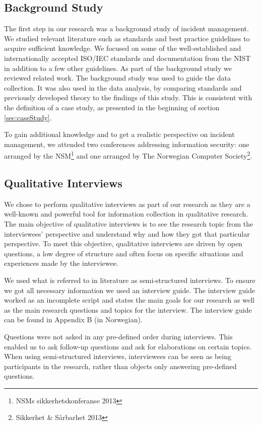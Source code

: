 \subsection{Background Study}
\label{sec:background}
The first step in our research was a background study of incident management. We studied relevant literature such as standards and best practice guidelines to acquire sufficient knowledge. We focused on some of the well-established and internationally accepted ISO/IEC standards and documentation from the \ac{NIST} in addition to a few other guidelines. As part of the background study we reviewed related work. The background study was used to guide the data collection. It was also used in the data analysis, by comparing standards and previously developed theory to the findings of this study. This is consistent with the definition of a case study, as presented in the beginning of section \ref{sec:caseStudy}.

To gain additional knowledge and to get a realistic perspective on incident management, we attended two conferences addressing information security: one arranged by the \ac{NSM}\footnote{NSMs sikkerhetskonferanse 2013} and one arranged by The Norwegian Computer Society\footnote{Sikkerhet \& S\aa rbarhet 2013}.

\subsection{Qualitative Interviews}
\label{sec:interviews}
We chose to perform qualitative interviews as part of our research as they are a well-known and powerful tool for information collection in qualitative research\cite{myers2007qualitative}. The main objective of qualitative interviews is to see the research topic from the interviewees' perspective and understand why and how they got that particular perspective\cite{cassell2004essential}. To meet this objective, qualitative interviews are driven by open questions, a low degree of structure and often focus on specific situations and experiences made by the interviewee. 

We used what is referred to in literature as semi-structured interviews\cite{cassell2004essential}. To ensure we got all necessary information we used an interview guide. The interview guide worked as an incomplete script and states the main goals for our research as well as the main research questions and topics for the interview. The interview guide can be found in Appendix B (in Norwegian).

Questions were not asked in any pre-defined order during interviews. This enabled us to ask follow-up questions and ask for elaborations on certain topics. When using semi-structured interviews, interviewees can be seen as being participants in the research, rather than objects only answering pre-defined questions.

